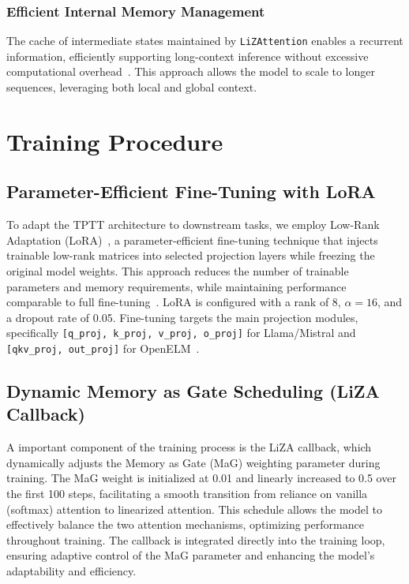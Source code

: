 \documentclass[10pt,a4paper]{article}
\begin{document}
\subsubsection{Efficient Internal Memory Management}

The cache of intermediate states maintained by \texttt{LiZAttention} enables a recurrent information, efficiently supporting long-context inference without excessive computational overhead~\cite{katharopoulos2020transformers}. This approach allows the model to scale to longer sequences, leveraging both local and global context.

\section{Training Procedure}

\subsection{Parameter-Efficient Fine-Tuning with LoRA}

To adapt the TPTT architecture to downstream tasks, we employ Low-Rank Adaptation (LoRA)~\cite{hu2022lora, lora_hf}, a parameter-efficient fine-tuning technique that injects trainable low-rank matrices into selected projection layers while freezing the original model weights. This approach reduces the number of trainable parameters and memory requirements, while maintaining performance comparable to full fine-tuning~\cite{hu2022lora, lora_hf}. LoRA is configured with a rank of 8, $\alpha=16$, and a dropout rate of 0.05. Fine-tuning targets the main projection modules, specifically \texttt{[q\_proj, k\_proj, v\_proj, o\_proj]} for Llama/Mistral and \texttt{[qkv\_proj, out\_proj]} for OpenELM~\cite{lora_hf}.

\subsection{Dynamic Memory as Gate Scheduling (LiZA Callback)}

A important component of the training process is the LiZA callback, which dynamically adjusts the Memory as Gate (MaG) weighting parameter during training. The MaG weight is initialized at 0.01 and linearly increased to 0.5 over the first 100 steps, facilitating a smooth transition from reliance on vanilla (softmax) attention to linearized attention. This schedule allows the model to effectively balance the two attention mechanisms, optimizing performance throughout training. The callback is integrated directly into the training loop, ensuring adaptive control of the MaG parameter and enhancing the model's adaptability and efficiency.
\end{document}
